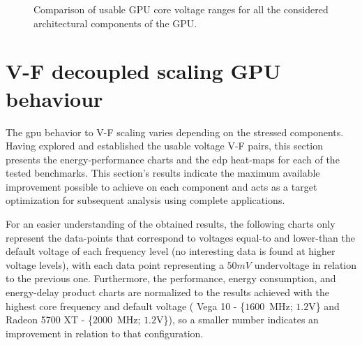 \begin{figure}
    \centering
    \begin{subfigmatrix}{2}
      \label{fig:Comparison_Guardband}
    \end{subfigmatrix}
    \caption{Comparison of usable GPU core voltage ranges for all the considered architectural components of the GPU.}
\end{figure}


\clearpage

\section{V-F decoupled scaling GPU behaviour}
\label{sec:gpu_behaviour}


The \acrshort{gpu} behavior to V-F scaling varies depending on the stressed components. Having explored and established the usable voltage V-F  pairs, this section presents the energy-performance charts and the \acrshort{edp} heat-maps for each of the tested benchmarks. This section's results indicate the maximum available improvement possible to achieve on each component and acts as a target optimization for subsequent analysis using complete applications. 



For an easier understanding of the obtained results, the following charts only represent the data-points that correspond to voltages equal-to and lower-than the default voltage of each frequency level (no interesting data is found at higher voltage levels), with each data point representing a $50mV$ undervoltage in relation to the previous one.
Furthermore, the performance, energy consumption, and energy-delay product charts are normalized to the results achieved with the highest core frequency and default voltage ( Vega 10 - \{$1600$~MHz; $1.2$V\} and Radeon 5700 XT - \{$2000$~MHz; $1.2$V\}), so a smaller number indicates an improvement in relation to that configuration. 

